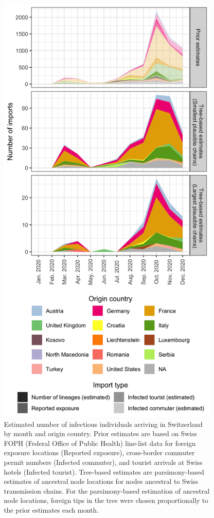 \documentclass[9pt,twocolumn,twoside,lineno]{pnas-new}
\begin{document}
\begin{figure}[tbhp]
\centering
\includegraphics[width=.8\linewidth]{figures/fig_2_chain_origins_per_chain_ch_tmrca.png}
\caption{Estimated number of infectious individuals arriving in Switzerland by month and origin country. Prior estimates are based on Swiss FOPH (Federal Office of Public Health) line-list data for foreign exposure locations (Reported exposure), cross-border commuter permit numbers (Infected commuter), and tourist arrivals at Swiss hotels (Infected tourist). Tree-based estimates are parsimony-based estimates of ancestral node locations for nodes ancestral to Swiss transmission chains. For the parsimony-based estimation of ancestral node locations, foreign tips in the tree were chosen proportionally to the prior estimates each month.}  
\label{fig:chain-origins}
\end{figure}
\end{document}
